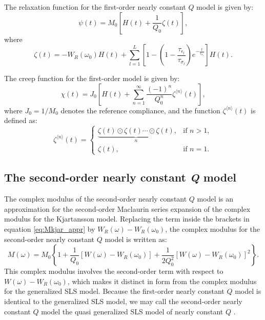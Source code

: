 \documentclass[article]{./macros/elsarticle_qh}
\begin{document}
The relaxation function for the first-order nearly constant $Q$ model is given by:
\begin{equation} \label{eq:psi1st}
\psi(t) = M_{0} \left[
H(t) + \frac{1}{Q_{0}} \zeta(t)
\right] ,
\end{equation}
where 
\begin{equation}
\zeta(t) = - W_{R}(\omega_{0}) H(t) 
+ 
\sum_{l=1}^{L} 
\left[
1 - \left(1 - 
\frac{\tau_{\epsilon_l}}{\tau_{\sigma_l}} 
\right)
e^{-\frac{t}{\tau_{\sigma_l}}}
\right] H(t). 
\end{equation}

The creep function for the first-order model is given by:
\begin{equation} \label{eq:chi1st}
\chi(t) = J_{0} \left[
H(t) + 
\sum_{n=1}^{\infty} \frac{(-1)^{n}}{Q_{0}^n} \zeta^{\langle n \rangle}(t)  
\right] ,
\end{equation}
where $J_{0} = 1/M_{0}$ denotes the reference compliance, and
the function $\zeta^{\langle n \rangle}(t)$ is defined as:
\begin{equation}
\zeta^{\langle n \rangle}(t) =
\begin{cases}
\underbrace{\zeta(t) \odot \zeta(t) \cdots \odot \zeta(t)}_{n}, & \text{if } n > 1, \\
\zeta(t), & \text{if } n = 1 .
\end{cases}
\end{equation}

\subsection{The second-order nearly constant \textit{Q} model}
The complex modulus of the second-order nearly constant $Q$ model is an approximation for the second-order Maclaurin series expansion of the complex modulus for the Kjartansson model. Replacing the term inside the brackets in equation \ref{eq:Mkjar_appr} by $W_{R}(\omega)-W_{R}(\omega_{0})$, the complex modulus for the second-order nearly constant $Q$ model is written as:
\begin{equation} \label{eq:M2nd}
M(\omega) = M_{0} \left \{
1 + \frac{1}{Q_{0}} 
\left[W(\omega) - W_{R}(\omega_{0}) \right] 
+ \frac{1}{2Q_{0}^2} 
\left[W(\omega) - W_{R}(\omega_{0}) \right]^2
\right \}.
\end{equation}
This complex modulus involves the second-order term with respect to $W(\omega) - W_{R}(\omega_{0})$, which makes it distinct in form from the complex modulus for the generalized SLS model. Because the first-order nearly constant $Q$ model is identical to the generalized SLS model, we may call the second-order nearly constant $Q$ model the quasi generalized SLS model of nearly constant $Q$ . 
\end{document}
